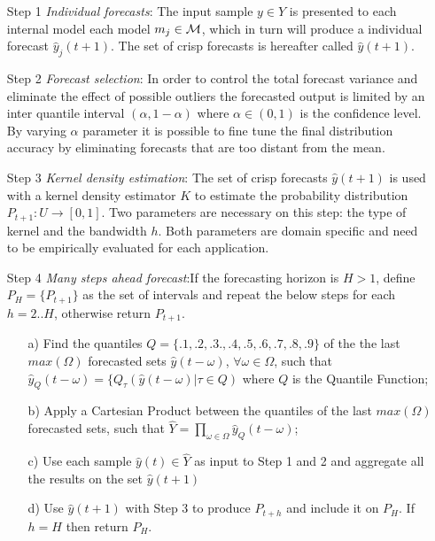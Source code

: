 \begin{enumerate}

\item[Step 1] \textit{Individual forecasts}: The input sample $y \in Y$ is presented to each internal model each model $m_j \in \mathcal{M}$, which in turn will produce a individual forecast $\hat{y}_j(t+1)$. The set of crisp forecasts is hereafter called $\hat{y}(t+1)$.

\item[Step 2] \textit{Forecast selection}: In order to control the total forecast variance and eliminate the effect of possible outliers the forecasted output is limited by an inter quantile interval $(\alpha, 1-\alpha)$ where $\alpha \in (0,1)$ is the confidence level. By varying $\alpha$ parameter it is possible to fine tune the final distribution accuracy by eliminating forecasts that are too distant from the mean.

\item[Step 3] \textit{Kernel density estimation}: The set of crisp forecasts $\hat{y}(t+1)$ is used with a kernel density estimator $K$ to estimate the probability distribution $P_{t+1}: U \rightarrow [0,1]$. Two parameters are necessary on this step: the type of kernel and the bandwidth $h$. Both parameters are domain specific and need to be empirically evaluated for each application.

\item[Step 4] \textit{Many steps ahead forecast}:If the forecasting horizon is $H > 1$, define $P_H = \{P_{t+1}\}$ as the set of intervals and repeat the below steps for each $h=2..H$, otherwise return  $P_{t+1}$.
\begin{enumerate}
    \item[a)]  Find the quantiles $Q = \{.1, .2, .3., .4, .5, .6, .7, .8, .9\}$ of the the last $max(\Omega)$ forecasted sets $\hat{y}(t-\omega)$, $\forall \omega \in \Omega$, such that $\hat{y}_Q(t-\omega) = \{ Q_\tau(\hat{y}(t-\omega) | \tau \in Q)$ where $Q$ is the Quantile Function;
    \item[b)] Apply a Cartesian Product between the quantiles of the last $max(\Omega)$ forecasted sets, such that $\hat{Y} = \prod_{\omega \in \Omega} \hat{y}_Q(t-\omega)$; 
    \item[c)] Use each sample $\hat{y}(t) \in \hat{Y}$ as input to Step 1 and 2 and aggregate all the results on the set $\hat{y}(t+1)$
    \item[d)] Use $\hat{y}(t+1)$ with Step 3 to produce $P_{t+h}$ and include it on $P_H$. If $h=H$ then return $P_H$.
\end{enumerate}

\end{enumerate}

